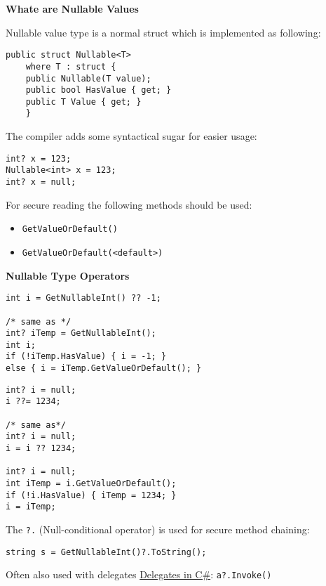 \documentclass[11pt,twoside,landscape]{article}
\begin{document}
\begin{multicols}{3}
\textbf{Whate are Nullable Values}

Nullable value type is a normal struct which is implemented as following:
\lstset{language=csharp,label= ,caption= ,captionpos=b,numbers=none}
\begin{lstlisting}
public struct Nullable<T>
    where T : struct {
	public Nullable(T value);
	public bool HasValue { get; }
	public T Value { get; }
    }
\end{lstlisting}

The compiler adds some syntactical sugar for easier usage:
\lstset{language=csharp,label= ,caption= ,captionpos=b,numbers=none}
\begin{lstlisting}
int? x = 123;
Nullable<int> x = 123;
int? x = null;
\end{lstlisting}

For secure reading the following methods should be used:
\begin{itemize}
\item \texttt{GetValueOrDefault()}
\item \texttt{GetValueOrDefault(<default>)}
\end{itemize}


\textbf{Nullable Type Operators}
\begin{lstlisting}
int i = GetNullableInt() ?? -1;

/* same as */
int? iTemp = GetNullableInt();
int i;
if (!iTemp.HasValue) { i = -1; }
else { i = iTemp.GetValueOrDefault(); }
\end{lstlisting}

\begin{lstlisting}
int? i = null;
i ??= 1234;

/* same as*/
int? i = null;
i = i ?? 1234;

int? i = null;
int iTemp = i.GetValueOrDefault();
if (!i.HasValue) { iTemp = 1234; }
i = iTemp;

\end{lstlisting}


The \texttt{?.} (Null-conditional operator) is used for secure method chaining:
\lstset{language=csharp,label= ,caption= ,captionpos=b,numbers=none}
\begin{lstlisting}
string s = GetNullableInt()?.ToString();
\end{lstlisting}
Often also used with delegates \href{../../../roam/20211029145415-delegates_in_c.org}{Delegates in C\#}: \texttt{a?.Invoke()}


\end{multicols}
\end{document}
